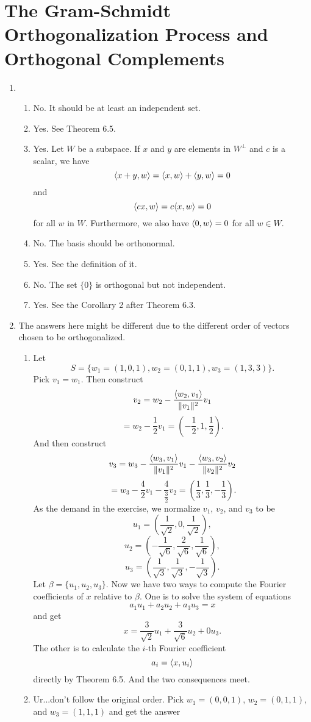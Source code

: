 \section{The Gram-Schmidt Orthogonalization Process and Orthogonal Complements}
\begin{enumerate}
\item \begin{enumerate}
\item No. It should be at least an independent set.
\item Yes. See Theorem 6.5.
\item Yes. Let $W$ be a subspace. If $x$ and $y$ are elements in $W^{\perp }$ and $c$ is a scalar, we have 
\[\langle x+y,w\rangle =\langle x,w\rangle +\langle y,w\rangle =0\]
and 
\[\langle cx,w\rangle =c\langle x,w\rangle =0\]
for all $w$ in $W$. 
Furthermore, we also have $\langle 0, w\rangle =0$ for all $w\in W$.
\item No. The basis should be orthonormal.
\item Yes. See the definition of it.
\item No. The set $\{0\}$ is orthogonal but not independent.
\item Yes. See the Corollary 2 after Theorem 6.3.
\end{enumerate}
\item The answers here might be different due to the different order of vectors chosen to be orthogonalized. \begin{enumerate}
\item Let 
\[S=\{w_1=(1,0,1),w_2=(0,1,1),w_3=(1,3,3)\}.\]
Pick $v_1=w_1$. Then construct 
\[v_2=w_2-\frac{\langle w_2,v_1\rangle}{\|v_1\|^2}v_1\]
\[=w_2-\frac{1}{2}v_1=(-\frac{1}{2},1,\frac{1}{2}).\]
And then construct 
\[v_3=w_3-\frac{\langle w_3,v_1\rangle}{\|v_1\|^2}v_1-\frac{\langle w_3,v_2\rangle}{\|v_2\|^2}v_2\]
\[=w_3-\frac{4}{2}v_1-\frac{4}{\frac{3}{2}}v_2=(\frac{1}{3},\frac{1}{3},-\frac{1}{3}).\]
As the demand in the exercise, we normalize $v_1$, $v_2$, and $v_3$ to be 
\[u_1=(\frac{1}{\sqrt{2}},0,\frac{1}{\sqrt{2}}),\]
\[u_2=(-\frac{1}{\sqrt{6}},\frac{2}{\sqrt{6}},\frac{1}{\sqrt{6}}),\]
\[u_3=(\frac{1}{\sqrt{3}},\frac{1}{\sqrt{3}},-\frac{1}{\sqrt{3}}).\]
Let $\beta =\{u_1,u_2,u_3\}$. Now we have two ways to compute the Fourier coefficients of $x$ relative to $\beta $. One is to solve the system of equations 
\[a_1u_1+a_2u_2+a_3u_3=x\]
and get 
\[x=\frac{3}{\sqrt{2}}u_1+\frac{3}{\sqrt{6}}u_2+0u_3.\]
The other is to calculate the $i$-th Fourier coefficient 
\[a_i=\langle x,u_i\rangle \]
directly by Theorem 6.5. And the two consequences meet.
\item Ur...don't follow the original order. Pick $w_1=(0,0,1)$, $w_2=(0,1,1)$, and $w_3=(1,1,1)$ and get the answer 

\end{enumerate}
\end{enumerate}
